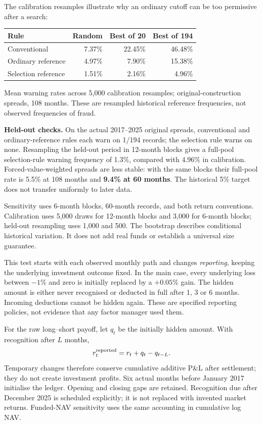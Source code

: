 \documentclass[11pt,letterpaper]{article}
\newcommand{\subhead}[1]{\vspace{5pt}{\large\bfseries #1}\par}
\newcommand{\note}[1]{{\small #1\par}}
\begin{document}
The calibration resamples illustrate why an ordinary cutoff can be too permissive after a search:
\begin{center}
\begin{tabular}{lrrr}
\toprule
Rule & Random & Best of 20 & Best of 194 \\
\midrule
Conventional & 7.37\% & 22.45\% & 46.48\% \\
Ordinary reference & 4.97\% & 7.90\% & 15.38\% \\
Selection reference & 1.51\% & 2.16\% & 4.96\% \\
\bottomrule
\end{tabular}
\end{center}
\note{Mean warning rates across 5,000 calibration resamples; original-construction spreads, 108 months. These are resampled historical reference frequencies, not observed frequencies of fraud.}

\textbf{Held-out checks.} On the actual 2017--2025 original spreads, conventional and ordinary-reference rules each warn on 1/194 records; the selection rule warns on none. Resampling the held-out period in 12-month blocks gives a full-pool selection-rule warning frequency of 1.3\%, compared with 4.96\% in calibration. Forced-value-weighted spreads are less stable: with the same blocks their full-pool rate is 5.5\% at 108 months and \textbf{9.4\% at 60 months}. The historical 5\% target does not transfer uniformly to later data.

\note{Sensitivity uses 6-month blocks, 60-month records, and both return conventions. Calibration uses 5,000 draws for 12-month blocks and 3,000 for 6-month blocks; held-out resampling uses 1,000 and 500. The bootstrap describes conditional historical variation. It does not add real funds or establish a universal size guarantee.}

\newpage
\subhead{3. What a stricter screen misses}
This test starts with each observed monthly path and changes \emph{reporting}, keeping the underlying investment outcome fixed. In the main case, every underlying loss between $-1\%$ and zero is initially replaced by a $+0.05\%$ gain. The hidden amount is either never recognised or deducted in full after 1, 3 or 6 months. Incoming deductions cannot be hidden again. These are specified reporting policies, not evidence that any factor manager used them.

For the raw long--short payoff, let $q_t$ be the initially hidden amount. With recognition after $L$ months,
\[
 r_t^{\rm reported}=r_t+q_t-q_{t-L}.
\]
Temporary changes therefore conserve cumulative additive P\&L after settlement; they do not create investment profits. Six actual months before January 2017 initialise the ledger. Opening and closing gaps are retained. Recognition due after December 2025 is scheduled explicitly; it is not replaced with invented market returns. Funded-NAV sensitivity uses the same accounting in cumulative log NAV.
\end{document}
